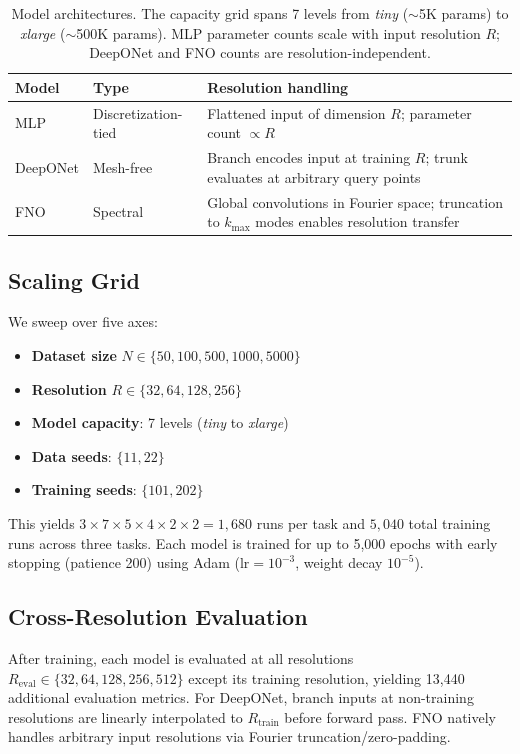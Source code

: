 \documentclass[11pt]{article}
\newcommand{\Reval}{R_{\mathrm{eval}}}
\newcommand{\Rtrain}{R_{\mathrm{train}}}
\begin{document}
\begin{table}[h]
\centering
\caption{Model architectures. The capacity grid spans 7 levels from
\textit{tiny} ($\sim$5K params) to \textit{xlarge} ($\sim$500K params).
MLP parameter counts scale with input resolution $R$; DeepONet and
FNO counts are resolution-independent.}
\label{tab:models}
\begin{tabular}{@{}llp{6cm}@{}}
\toprule
\textbf{Model} & \textbf{Type} & \textbf{Resolution handling} \\
\midrule
MLP & Discretization-tied &
  Flattened input of dimension $R$; parameter count $\propto R$ \\
DeepONet & Mesh-free &
  Branch encodes input at training $R$; trunk evaluates at arbitrary
  query points \\
FNO & Spectral &
  Global convolutions in Fourier space; truncation to $k_{\max}$ modes
  enables resolution transfer \\
\bottomrule
\end{tabular}
\end{table}

\subsection{Scaling Grid}
We sweep over five axes:
\begin{itemize}
  \item \textbf{Dataset size} $N \in \{50, 100, 500, 1000, 5000\}$
  \item \textbf{Resolution} $R \in \{32, 64, 128, 256\}$
  \item \textbf{Model capacity}: 7 levels (\textit{tiny} to
    \textit{xlarge})
  \item \textbf{Data seeds}: $\{11, 22\}$
  \item \textbf{Training seeds}: $\{101, 202\}$
\end{itemize}
This yields $3 \times 7 \times 5 \times 4 \times 2 \times 2 = 1{,}680$
runs per task and $5{,}040$ total training runs across three tasks. Each
model is trained for up to 5{,}000 epochs with early stopping (patience
200) using Adam ($\text{lr} = 10^{-3}$, weight decay $10^{-5}$).

\subsection{Cross-Resolution Evaluation}
After training, each model is evaluated at all resolutions
$\Reval \in \{32, 64, 128, 256, 512\}$ except its training resolution,
yielding 13{,}440 additional evaluation metrics. For DeepONet, branch
inputs at non-training resolutions are linearly interpolated to
$\Rtrain$ before forward pass. FNO natively handles arbitrary input
resolutions via Fourier truncation/zero-padding.
\end{document}

